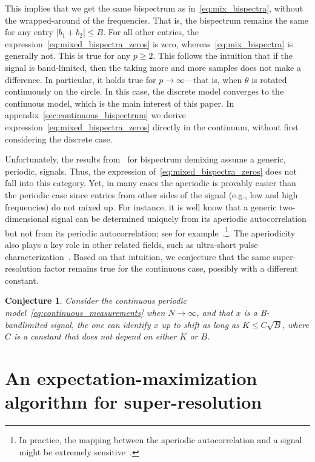 \documentclass[english,12pt]{article}
\newcommand{\TODO}[1]{{\color{red}{[#1]}}}
\numberwithin{equation}{section}
\numberwithin{thm}{section} %
\newtheorem{conj}[thm]{Conjecture}
\begin{document}
This implies that we get the same bispectrum as in~\eqref{eq:mix_bispectra}, without the wrapped-around of the frequencies. 
That is, the bispectrum remains the same for any entry $\vert b_1 + b_2\vert \leq B$. For all other entries, the expression~\eqref{eq:mixed_bispectra_zeros} is zero, whereas~\eqref{eq:mix_bispectra} is generally not. 
This is true for any $p\geq 2$. 
This follows the intuition that if the signal is band-limited, then the taking more and more samples does not make a difference. \TODO{Does it?} 
In particular, it holds true for $p\to\infty$---that is, when $\theta$ is rotated continuously on the circle. In this case, the discrete model converges to the continuous model, which is the main interest of this paper. In appendix~\ref{sec:continuous_bispectrum} we derive expression~\eqref{eq:mixed_bispectra_zeros} directly in the continuum, without first considering the discrete case. 

Unfortunately, the results from~\cite{bandeira2017estimation} for bispectrum demixing assume a generic, periodic, signals. Thus, the expression of~\eqref{eq:mixed_bispectra_zeros} does not fall into this category. Yet, in many cases the aperiodic is provably easier than the periodic case since entries from other sides of the signal (e.g.,
low and high frequencies) do not mixed up. 
For instance, it is well know that a generic two-dimensional signal can be determined uniquely from its aperiodic autocorrelation but not from its periodic autocorrelation; see for example~\cite{hayes1982reconstruction}.\footnote{In practice, the mapping between the aperiodic autocorrelation and a signal might be extremely sensitive~\cite{barnett2018geometry}.}. The aperiodicity also plays a key role in other related fields, such as ultra-short pulse characterization~\cite{bendory2018signal}. 
Based on that intuition, we conjecture that the same super-resolution factor remains true for the continuous case, possibly with a different constant. 

\begin{conj}
Consider the  continuous periodic model~\eqref{eq:continuous_measurements} when $N\to\infty$, and that $x$ is a B-bandlimited signal, the  one can identify $x$ up to shift as long as $K\leq C \sqrt{B}$, where $C$ is a constant that does not depend on either $K$ or $B$.
\end{conj}

\section{An expectation-maximization algorithm for super-resolution}
\end{document}

